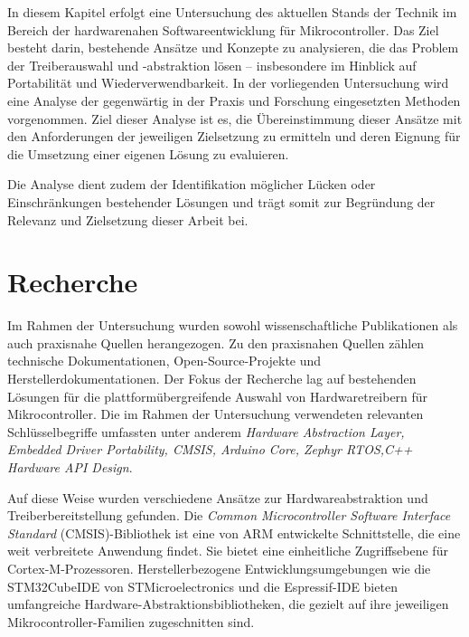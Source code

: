 In diesem Kapitel erfolgt eine Untersuchung des aktuellen Stands der Technik im Bereich der hardwarenahen Softwareentwicklung für Mikrocontroller.
Das Ziel besteht darin, bestehende Ansätze und Konzepte zu analysieren, die das Problem der Treiberauswahl und -abstraktion lösen – insbesondere im Hinblick auf Portabilität und Wiederverwendbarkeit. 
In der vorliegenden Untersuchung wird eine Analyse der gegenwärtig in der Praxis und Forschung eingesetzten Methoden vorgenommen. 
Ziel dieser Analyse ist es, die Übereinstimmung dieser Ansätze mit den Anforderungen der jeweiligen Zielsetzung zu ermitteln und deren Eignung für die Umsetzung einer eigenen Lösung zu evaluieren.

Die Analyse dient zudem der Identifikation möglicher Lücken oder Einschränkungen bestehender Lösungen und trägt somit zur Begründung der Relevanz und Zielsetzung dieser Arbeit bei.


\section{Recherche}
Im Rahmen der Untersuchung wurden sowohl wissenschaftliche Publikationen als auch praxisnahe Quellen herangezogen. 
Zu den praxisnahen Quellen zählen technische Dokumentationen, Open-Source-Projekte und Herstellerdokumentationen.
Der Fokus der Recherche lag auf bestehenden Lösungen für die plattformübergreifende Auswahl von Hardwaretreibern für Mikrocontroller.
Die im Rahmen der Untersuchung verwendeten relevanten Schlüsselbegriffe umfassten unter anderem \textit{Hardware Abstraction Layer, Embedded Driver Portability, CMSIS, Arduino Core, Zephyr RTOS,C++ Hardware API Design}.

Auf diese Weise wurden verschiedene Ansätze zur Hardwareabstraktion und Treiberbereitstellung gefunden.
Die \emph{Common Microcontroller Software Interface Standard} (CMSIS)-Bibliothek ist eine von ARM entwickelte Schnittstelle, die eine weit verbreitete Anwendung findet. 
Sie bietet eine einheitliche Zugriffsebene für Cortex-M-Prozessoren. 
Herstellerbezogene Entwicklungsumgebungen wie die STM32CubeIDE von STMicroelectronics und die Espressif-IDE bieten umfangreiche Hardware-Abstraktionsbibliotheken, die gezielt auf ihre jeweiligen Mikrocontroller-Familien zugeschnitten sind.

